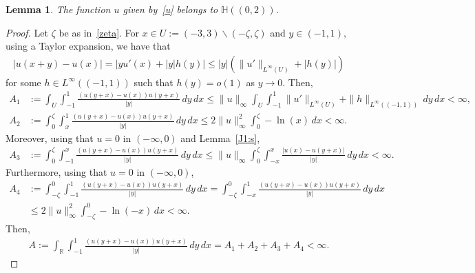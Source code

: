\documentclass[11pt]{article}
\newcommand{\R}{\mathbb{R}}
\numberwithin{equation}{section}
\newtheorem{lemma}[theorem]{Lemma}
\begin{document}
 
 \begin{lemma}\label{uinH:lem}
The function $u$ given by~\eqref{u} belongs to ${\mathbb H}((0,2))$.
 \end{lemma}
 \begin{proof}
Let $\zeta$ be as in~\eqref{zeta}. For $x\in U:=(-3,3)\backslash(-\zeta,\zeta)$ and $y\in(-1,1),$ using a Taylor expansion, we have that
\begin{align*}
    |u(x+y)-u(x)|=|yu'(x)+|y|h(y)|\leq |y|(\|u'\|_{L^\infty(U)}+|h(y)|)
\end{align*}
for some $h\in L^\infty((-1,1))$ such that $h(y)=o(1)$ as $y\to 0.$  Then,
\begin{align*}
A_1&:=\int_{U}\int_{-1}^{1}\frac{(u(y+x)-u(x))u(y+x)}{|y|} \, dy\, dx
\leq \|u\|_\infty \int_{U}\int_{-1}^{1} \|u'\|_{L^\infty(U)}+\|h\|_{L^\infty((-1,1))}\, dy\, dx<\infty,\\
A_2&:=\int_{0}^{\zeta}\int_{x}^{1}\frac{(u(y+x)-u(x))u(y+x)}{|y|} \, dy\, dx
    \leq 2\|u\|^2_\infty \int_{0}^{\zeta}-\ln(x)\, dx<\infty.
\end{align*}
Moreover, using that $u=0$ in $(-\infty,0)$ and Lemma~\ref{J1:s},
\begin{align*}
A_3&:=\int_{0}^{\zeta}\int_{-1}^{x}\frac{(u(y+x)-u(x))u(y+x)}{|y|} \, dy\, dx
\leq \|u\|_\infty\int_{0}^{\zeta}\int_{-x}^{x}\frac{|u(x)-u(y+x)|}{|y|} \, dy\, dx<\infty.
\end{align*}
Furthermore,  using that $u=0$ in $(-\infty,0)$,
\begin{align*}
A_4&
:=\int_{-\zeta}^{0}\int_{-1}^{1}\frac{(u(y+x)-u(x))u(y+x)}{|y|} \, dy\, dx
=\int_{-\zeta}^{0}\int_{-x}^{1}\frac{(u(y+x)-u(x))u(y+x)}{|y|} \, dy\, dx\\
&\leq 2\|u\|^2_\infty\int_{-\zeta}^{0}-\ln(-x)\, dx<\infty.
\end{align*}
Then,
\begin{align}\label{As}
A:=\int_{\R}\int_{-1}^{1}\frac{(u(y+x)-u(x))u(y+x)}{|y|}\, dy\, dx=A_1+A_2+A_3+A_4<\infty.
\end{align}


\end{proof}
\end{document}
